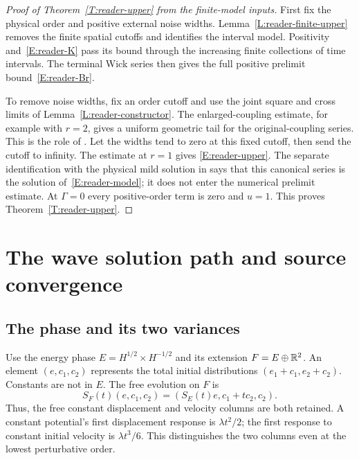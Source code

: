 \begin{proof}[Proof of Theorem~\ref{T:reader-upper} from the finite-model inputs]
  First fix the physical order and positive external noise widths.
  Lemma~\ref{L:reader-finite-upper} removes the finite spatial cutoffs and
  identifies the interval model. Positivity and~\eqref{E:reader-K} pass its
  bound through the increasing finite collections of time intervals. The
  terminal Wick series then gives the full positive prelimit
  bound~\eqref{E:reader-Br}.

  To remove noise widths, fix an order cutoff and use the joint square and cross
  limits of Lemma~\ref{L:reader-constructor}. The enlarged-coupling estimate,
  for example with $r = 2$, gives a uniform geometric tail for the
  original-coupling series. This is the role of
  . Let the widths tend to zero at this
  fixed cutoff, then send the cutoff to infinity. The estimate at $r = 1$ gives
  \eqref{E:reader-upper}. The separate identification with the physical mild
  solution in  says that this canonical
  series is the solution of~\eqref{E:reader-model}; it does not enter the
  numerical prelimit estimate. At $\Gamma = 0$ every positive-order term is zero
  and $u = 1$. This proves Theorem~\ref{T:reader-upper}.
\end{proof}

\section{The wave solution path and source convergence}\label{S:reader-path}
\subsection{The phase and its two variances}

Use the energy phase $E = H^{1/2}\times H^{-1/2}$ and its extension $F =
E\oplus\mathbb R^2$. An element $(e,c_1,c_2)$ represents the total initial
distributions $(e_1+c_1,e_2+c_2)$. Constants are not in $E$. The free evolution
on $F$ is
\begin{equation}\label{E:reader-free-F}
  S_F(t)(e,c_1,c_2)=(S_E(t)e,c_1+tc_2,c_2).
\end{equation}
Thus, the free constant displacement and velocity columns are both retained. A
constant potential's first displacement response is $\lambda t^2/2$; the first
response to constant initial velocity is $\lambda t^3/6$. This distinguishes the
two columns even at the lowest perturbative order.

